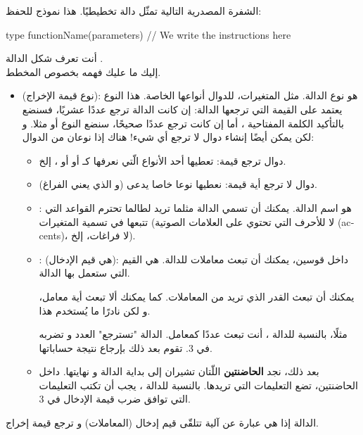 الشفرة المصدرية التالية تمثّل دالة تخطيطيًا. هذا نموذج للحفظ:

\begin{Csource}
type functionName(parameters)
{
	// We write the instructions here
}
\end{Csource}

أنت تعرف شكل الدالة
.\\
إليك ما عليك فهمه بخصوص المخطط.

\begin{itemize}
	\item {}
	 (نوع قيمة الإخراج): 
	هو نوع الدالة. مثل المتغيرات، للدوال أنواعها الخاصة. هذا النوع يعتمد على القيمة التي ترجعها الدالة: إن كانت الدالة ترجع عددًا عشريًا، فسنضع بالتأكيد الكلمة المفتاحية 
	،
	أما إن كانت ترجع عددًا صحيحًا، سنضع النوع 
	أو 
	مثلا. و لكن يمكن أيضًا إنشاء دوال لا ترجع أي شيء!
	هناك إذا نوعان من الدوال:
	\begin{itemize}
		\item دوال ترجع قيمة: تعطيها أحد الأنواع الّتي نعرفها كـ
		أو 
		أو 
		،
		إلخ.
		\item دوال لا ترجع أية قيمة: نعطيها نوعا خاصا يدعى 
		(و الذي يعني الفراغ).
		\item {}:
		هو اسم الدالة. يمكنك أن تسمي الدالة مثلما تريد لطالما تحترم القواعد التي تتبعها في تسمية المتغيرات (لا للأحرف التي تحتوي على العلامات الصوتية
		(\textenglish{accents})،
		لا فراغات، إلخ).
		\item {}:
		(هي قيم الإدخال): داخل قوسين، يمكنك أن تبعث معاملات للدالة. هي القيم التي ستعمل بها الدالة.
		\begin{information}
			يمكنك أن تبعث القدر الذي تريد من المعاملات. كما يمكنك ألا تبعث أية معامل، و لكن نادرًا ما يُستخدم هذا.
		\end{information}
		
		مثلًا، بالنسبة للدالة 
		،
		أنت تبعث عددًا كمعامل. الدالة "تسترجع" العدد و تضربه في 3. تقوم بعد ذلك بإرجاع نتيجة حساباتها.
		\item بعد ذلك، نجد 
		\textbf{الحاضنتين}
		اللّتان تشيران إلى بداية الدالة و نهايتها. داخل الحاضنتين، تضع التعليمات التي تريدها. بالنسبة للدالة 
		،
		يجب أن تكتب التعليمات التي توافق ضرب قيمة الإدخال في 3.
	\end{itemize}
\end{itemize}
الدالة إذا هي عبارة عن آلية تتلقّى قيم إدخال (المعاملات) و ترجع قيمة إخراج.

